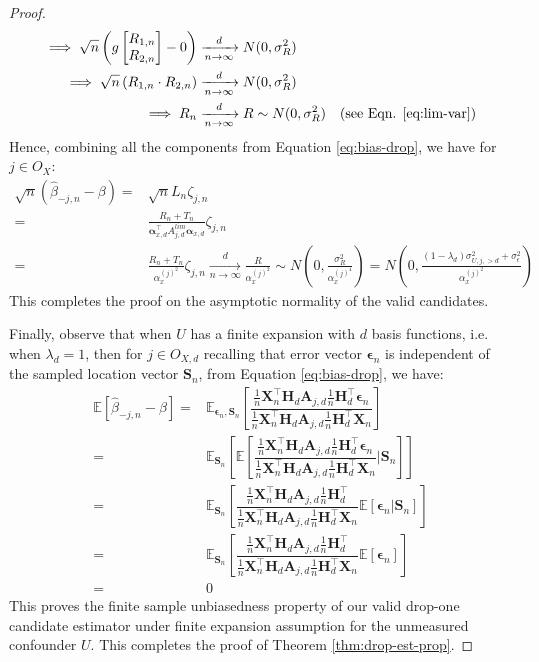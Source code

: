 \documentclass[
  12pt]{article}
\newcommand{\dnlim}{\xrightarrow[n \to \infty]{d}}
\newcommand{\bX}{\boldsymbol{X}}
\newcommand{\bS}{\boldsymbol{S}}
\newcommand{\balp}{\boldsymbol{\alpha}}
\newcommand{\bA}{\boldsymbol{A}}
\newcommand{\beps}{\boldsymbol{\epsilon}}
\newcommand{\E}{\mathbb{E}}
\newcommand{\bH}{\boldsymbol{H}}
\begin{document}
\begin{proof}
\begin{equation}
\begin{split}
    \implies \sqrt{n}\left(g\begin{bmatrix}
     R_{1,n}\\
     R_{2,n}
 \end{bmatrix} - 0\right) & \dnlim N(0,\sigma^2_R)\\
 \implies \sqrt{n}\left( R_{1,n}\cdot R_{2,n}\right)& \dnlim N(0,\sigma^2_R)\\
    \implies R_n & \dnlim R \sim N(0, \sigma^2_R) \quad \text{(see Eqn. \ref{eq:lim-var})}
    \end{split}
\end{equation}
Hence, combining all the components from Equation \ref{eq:bias-drop}, we have for $j \in O_X$:
\begin{equation}
    \begin{split}
        \sqrt{n}\left(\hat{\beta}_{-j,n} - \beta\right) = & \sqrt{n}L_n \zeta_{j,n}\\
        = & \frac{R_n + T_n}{\balp_{x,d}^\top A^{lim}_{j,d}\balp_{x,d}}\zeta_{j,n}\\
        = & \frac{R_n + T_n}{\alpha_x^{(j)^2}}\zeta_{j,n} \dnlim \frac{R}{\alpha_x^{(j)^2}} \sim N\left(0,\frac{\sigma^2_R}{\alpha_x^{(j)^4}}\right) = N\left(0,\frac{(1 - \lambda_{d}) \sigma^2_{U,j,>d} + \sigma^2_\epsilon}{\alpha_x^{(j)^2}}\right)
    \end{split}
\end{equation}
This completes the proof on the asymptotic normality of the valid candidates.

Finally, observe that when $U$ has a finite expansion with $d$ basis functions, i.e. when $\lambda_d = 1$, then for $j \in O_{X,d}$ recalling that  error vector $\beps_n$ is independent of the sampled location vector $\bS_n$, from Equation \ref{eq:bias-drop}, we have:
\begin{equation}
    \begin{split}
        \E\left[\hat{\beta}_{-j,n} - \beta\right] = & \E_{\beps_n,\bS_n}\left[\dfrac{\frac{1}{n}\bX_{n}^\top\bH_{d} \bA_{j,d}\frac{1}{n}\bH_{d}^\top\beps_n}{\frac{1}{n}\bX_{n}^\top\bH_{d} \bA_{j,d}\frac{1}{n}\bH_{d}^\top\bX_{n}}\right]\\
        = & \E_{\bS_n}\left[\E\left[\dfrac{\frac{1}{n}\bX_{n}^\top\bH_{d} \bA_{j,d}\frac{1}{n}\bH_{d}^\top\beps_n}{\frac{1}{n}\bX_{n}^\top\bH_{d} \bA_{j,d}\frac{1}{n}\bH_{d}^\top\bX_{n}}\Big| \bS_n\right]\right]\\
        = & \E_{\bS_n}\left[\dfrac{\frac{1}{n}\bX_{n}^\top\bH_{d} \bA_{j,d}\frac{1}{n}\bH_{d}^\top}{\frac{1}{n}\bX_{n}^\top\bH_{d} \bA_{j,d}\frac{1}{n}\bH_{d}^\top\bX_{n}}\E\left[\beps_n|\bS_n\right]\right]\\
        = & \E_{\bS_n}\left[\dfrac{\frac{1}{n}\bX_{n}^\top\bH_{d} \bA_{j,d}\frac{1}{n}\bH_{d}^\top}{\frac{1}{n}\bX_{n}^\top\bH_{d} \bA_{j,d}\frac{1}{n}\bH_{d}^\top\bX_{n}}\E\left[\beps_n\right]\right]\\
        = & 0
    \end{split}
\end{equation}
This proves the finite sample unbiasedness property of our valid drop-one candidate estimator under finite expansion assumption for the unmeasured confounder $U$. This completes the proof of Theorem \ref{thm:drop-est-prop}.
\end{proof}
\end{document}
